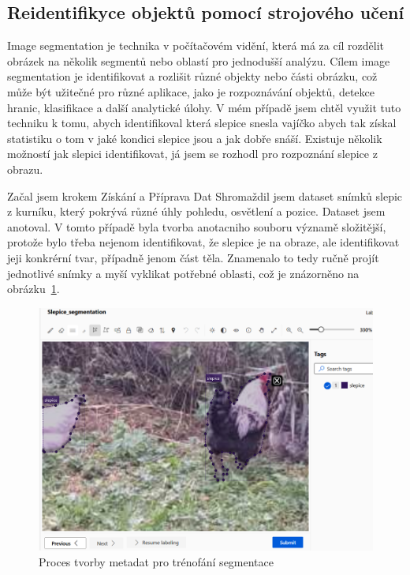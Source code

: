 
\subsection{Reidentifikyce objektů pomocí strojového učení}\label{subsec:klasifikace-a-segmentace-objektu-pomoci-strojoveho-uceni}

Image segmentation je technika v počítačovém vidění, která má za cíl rozdělit obrázek na několik segmentů nebo oblastí pro jednodušší analýzu.
Cílem image segmentation je identifikovat a rozlišit různé objekty nebo části obrázku, což může být užitečné pro různé aplikace, jako je rozpoznávání objektů, detekce hranic, klasifikace a další analytické úlohy.
V mém případě jsem chtěl využit tuto techniku k tomu, abych identifikoval která slepice snesla vajíčko abych tak získal statistiku o tom v jaké kondici slepice jsou a jak dobře snáší.
Existuje několik možností jak slepici identifikovat, já jsem se rozhodl pro rozpoznání slepice z obrazu.

Začal jsem krokem  Získání a Příprava Dat
Shromaždil jsem dataset snímků slepic z kurníku, který pokrývá různé úhly pohledu, osvětlení a pozice.
Dataset jsem anotoval.
V tomto případě byla tvorba anotacniho souboru významě složitější, protože bylo třeba nejenom identifikovat, že slepice je na obraze, ale identifikovat jeji konkrérní tvar, případně jenom část těla.
Znamenalo to tedy ručně projít jednotlivé snímky a myší vyklikat potřebné oblasti, což je znázorněno na obrázku~\ref{fig:label_segmentation}.

\begin{figure}[h]
    \centering
    \includegraphics[width=\textwidth]{img/label_segmentation}
    \caption{Proces tvorby metadat pro trénofání segmentace}
    \label{fig:label_segmentation}
\end{figure}

